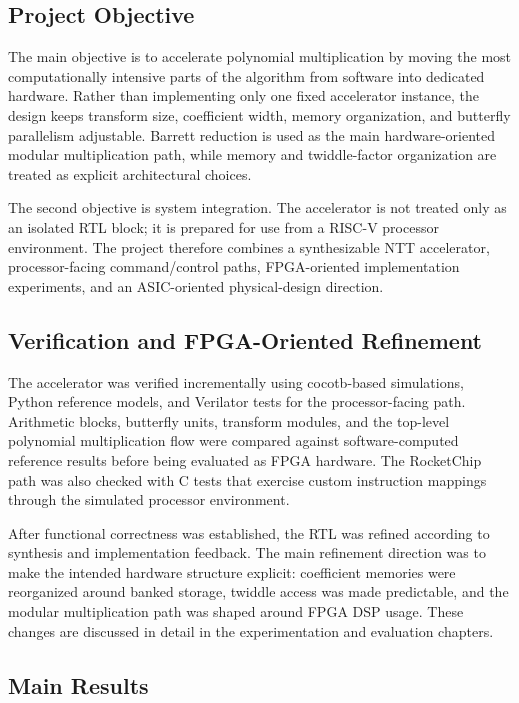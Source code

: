 \documentclass[a4paper, 12pt, titlepage]{article}
\begin{document}
\subsection{Project Objective}

The main objective is to accelerate polynomial multiplication by moving the
most computationally intensive parts of the algorithm from software into
dedicated hardware. Rather than implementing only one fixed accelerator
instance, the design keeps transform size, coefficient width, memory
organization, and butterfly parallelism adjustable. Barrett reduction is used
as the main hardware-oriented modular multiplication path, while memory and
twiddle-factor organization are treated as explicit architectural choices.

The second objective is system integration. The accelerator is not treated only
as an isolated RTL block; it is prepared for use from a RISC-V processor
environment. The project therefore combines a synthesizable NTT accelerator,
processor-facing command/control paths, FPGA-oriented implementation
experiments, and an ASIC-oriented physical-design direction.

\subsection{Verification and FPGA-Oriented Refinement}

The accelerator was verified incrementally using cocotb-based simulations,
Python reference models, and Verilator tests for the processor-facing path.
Arithmetic blocks, butterfly units, transform modules, and the top-level
polynomial multiplication flow were compared against software-computed
reference results before being evaluated as FPGA hardware. The RocketChip path
was also checked with C tests that exercise custom instruction mappings through
the simulated processor environment.

After functional correctness was established, the RTL was refined according to
synthesis and implementation feedback. The main refinement direction was to
make the intended hardware structure explicit: coefficient memories were
reorganized around banked storage, twiddle access was made predictable, and the
modular multiplication path was shaped around FPGA DSP usage. These changes are
discussed in detail in the experimentation and evaluation chapters.

\subsection{Main Results}
\end{document}
